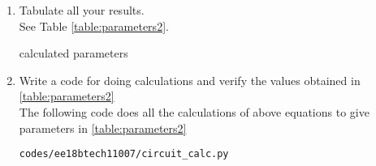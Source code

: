 \begin{enumerate}[label=\thesection.\arabic*.,ref=\thesection.\theenumi]
%
\item Tabulate all your results.
\\
\solution See Table \ref{table:parameters2}.  
\begin{table}[!ht]
\centering

\caption{calculated parameters}
\label{table:parameters2}
\end{table}
\item Write a code for doing calculations and verify the values obtained in \ref{table:parameters2} 
\\
\solution 
The following code does all the calculations of above equations to give parameters in
\ref{table:parameters2} 
\begin{lstlisting}
codes/ee18btech11007/circuit_calc.py
\end{lstlisting}



\end{enumerate}
